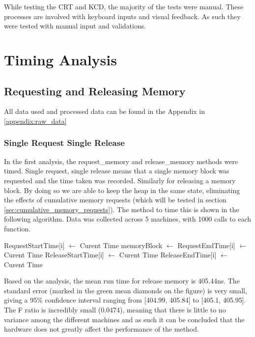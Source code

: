 \documentclass[12pt,twocolumn]{report}
\begin{document}
While testing the CRT and KCD, the majority of the tests were manual. These processes are involved with keyboard inputs and visual feedback. As such they were tested with manual input and validations. 


\chapter{Timing Analysis}

\section{Requesting and Releasing Memory}

\par All data used and processed data can be found in the Appendix in \ref{appendix:raw_data}

\subsection{Single Request Single Release}
\label{sec:single_request_single_release}
In the first analysis, the request\_memory and release\_memory methods were timed. Single request, single release means that a single memory block was requested and the time taken was recorded. Similarly for releasing a memory block. By doing so we are able to keep the heap in the same state, eliminating the effects of cumulative memory requests (which will be tested in section \ref{sec:cumulative_memory_requests}). The method to time this is shown in the following algorithm. Data was collected across 5 machines, with 1000 calls to each function.

\begin{algorithmic}
      \State RequestStartTime[i] $\gets$ Curent Time
      \State memoryBlock $\gets$  
      \State RequestEndTime[i] $\gets$ Curent Time
      \State ReleaseStartTime[i] $\gets$ Curent Time
      \State {}
      \State ReleaseEndTime[i] $\gets$ Curent Time
    \EndFor
  \EndFunction
\end{algorithmic}

Based on the analysis, the mean run time for release memory is 405.44ns. The standard error (marked in the green mean diamonds on the figure) is very small, giving a 95\% confidence interval ranging from [404.99, 405.84] to [405.1, 405.95]. The F ratio is incredibly small (0.0474), meaning that there is little to no variance among the different machines and as such it can be concluded that the hardware does not greatly affect the performance of the method.
\end{document}
